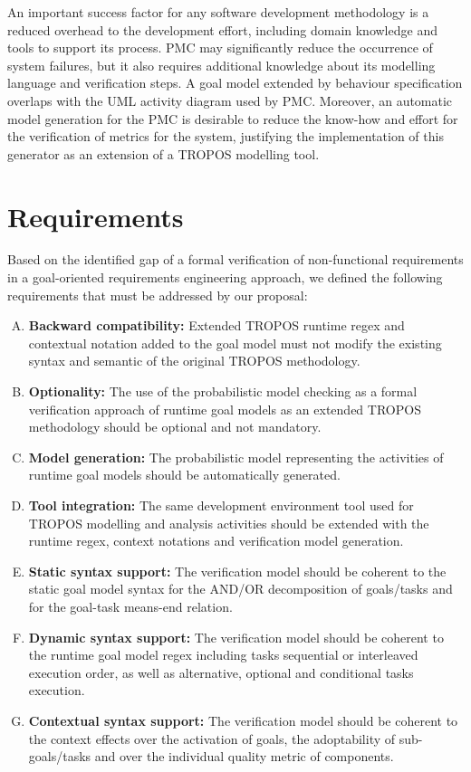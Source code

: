 An important success factor for any software development methodology is a reduced overhead to the development effort, including domain knowledge and tools to support its process. PMC may significantly reduce the occurrence of system failures, but it also requires additional knowledge about its modelling language and verification steps. A goal model extended by behaviour specification overlaps with the UML activity diagram used by PMC.  Moreover, an automatic model generation for the PMC is desirable to reduce the know-how and effort for the verification of metrics for the system, justifying the implementation of this generator as an extension of a TROPOS modelling tool.

\section{Requirements}

Based on the identified gap of a formal verification of non-functional requirements in a goal-oriented requirements engineering approach, we defined the following requirements that must be addressed by our proposal:

\begin{enumerate}[R.1]

\item \textbf{Backward compatibility:} Extended TROPOS runtime regex and contextual notation added to the goal model must not modify the existing syntax and semantic of the original TROPOS methodology.

\item \textbf{Optionality:} The use of the probabilistic model checking as a formal verification approach of runtime goal models as an extended TROPOS methodology should be optional and not mandatory.
\medskip

\item \textbf{Model generation:} The probabilistic model representing the activities of runtime goal models should be automatically generated.
\medskip

\item \textbf{Tool integration:} The same development environment tool used for TROPOS modelling and analysis activities should be extended with the runtime regex, context notations and verification model generation.
\medskip

\item \textbf{Static syntax support:} The verification model should be coherent to the static goal model syntax for the AND/OR decomposition of goals/tasks and for the goal-task means-end relation.
\medskip

\item \textbf{Dynamic syntax support:} The verification model should be coherent to the runtime goal model regex including tasks sequential or interleaved execution order, as well as alternative, optional and conditional tasks execution.
\medskip

\item \textbf{Contextual syntax support:} The verification model should be coherent to the context effects over the activation of goals, the adoptability of sub-goals/tasks and over the individual quality metric of components. 

\end{enumerate}